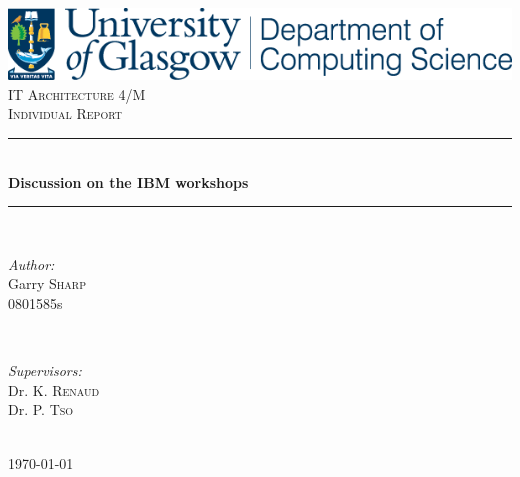 \documentclass[12pt]{article} %
\begin{document}

\begin{titlepage}

\newcommand{\HRule}{\rule{\linewidth}{0.5mm}} %
\center %
\includegraphics[width=\textwidth]{Glasgow}\\[1.5cm]
\textsc{\LARGE IT Architecture 4/M}\\[0.5cm] %
\textsc{\Large Individual Report}\\[0.5cm] %

\HRule \\[0.4cm]
{ \huge \bfseries Discussion on the IBM workshops}\\[0.4cm] %
\HRule \\[1.5cm]

\begin{minipage}{0.4\textwidth}
\begin{flushleft} \large
\emph{Author:}\\
Garry \textsc{Sharp}\\
0801585s\\ %
\end{flushleft}
\end{minipage}
~
\begin{minipage}{0.4\textwidth}
\begin{flushright} \large
\emph{Supervisors:} \\
Dr. K. \textsc{Renaud}\\ %
Dr. P. \textsc{Tso}\\ %
\end{flushright}
\end{minipage}\\[4cm]

{\large \today}\\[3cm] %

\vfill %

\end{titlepage}
\end{document}
